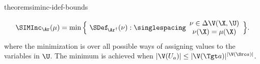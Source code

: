 \begin{linked}{theorem}{siminc-idef-bounds}
\begin{enumerate}[label={\normalfont(\alph*)},wide,topsep=0pt,itemsep=0pt,parsep=0pt]
    \[%
        \SIMInc_{\Ar}(\mu)
        = \min \Big\{\ \SDef_{\!\Ar^\dagger}(\nu) : 
            {\singlespacing\begin{array}{c}
            \nu \in  \Delta\V(\X,
                \U
            ) \\ \nu(\X) = \mu(\X)
            \end{array}}
         \Big\}
         .
    \]
where the minimization is over all possible ways of assigning values to 
the variables in
$\U$. The minimum is achieved when $|\V(U_a)| \le |\V(\Tgt a)|^{|\V(\Src a)|}$.
    \end{enumerate}
\end{linked}
%
